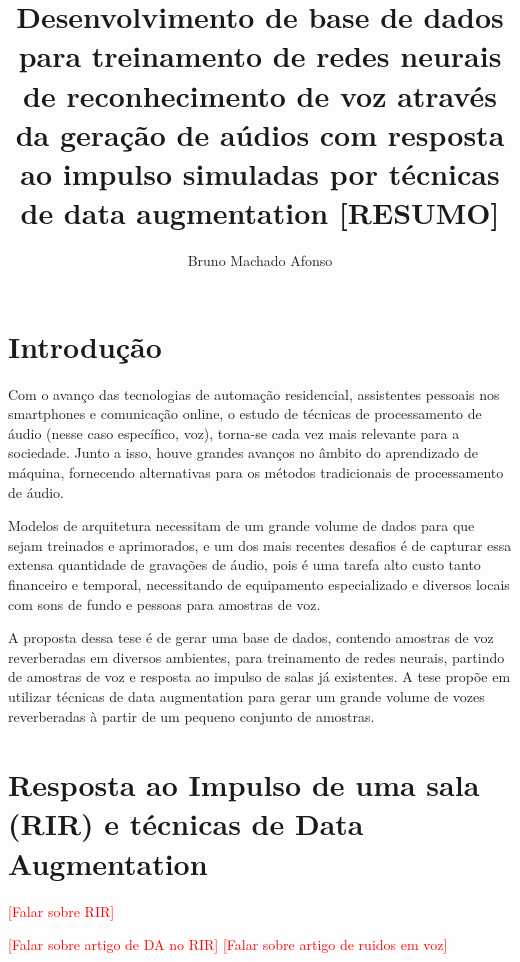 \documentclass{article}
\title{Desenvolvimento de base de dados para treinamento de redes neurais de reconhecimento de voz
através da geração de aúdios com resposta ao impulso simuladas por técnicas de data augmentation [RESUMO]}
\author{Bruno Machado Afonso}
\begin{document}
\maketitle

\section{Introdução}

Com o avanço das tecnologias de automação residencial, assistentes pessoais nos
smartphones e comunicação online, o estudo de técnicas de processamento de áudio (nesse 
caso específico, voz), torna-se cada vez mais relevante para a sociedade.
Junto a isso, houve grandes avanços no âmbito do aprendizado de máquina, fornecendo
alternativas para os métodos tradicionais de processamento de áudio.

Modelos de arquitetura necessitam de um grande volume de dados para que sejam 
treinados e aprimorados, e um dos mais recentes desafios é de capturar essa extensa 
quantidade de gravações de áudio, pois é uma tarefa alto custo tanto financeiro e 
temporal, necessitando de equipamento especializado e diversos locais com sons de fundo
e pessoas para amostras de voz.

A proposta dessa tese é de gerar uma base de dados, contendo amostras de voz reverberadas
em diversos ambientes, para treinamento de redes neurais, 
partindo de amostras de voz e resposta ao impulso de salas já existentes.
A tese propõe em utilizar técnicas de data augmentation para gerar um grande volume
de vozes reverberadas à partir de um pequeno conjunto de amostras.


\section{Resposta ao Impulso de uma sala (RIR) e técnicas de Data Augmentation}

\textcolor{red}{\LARGE{[Falar sobre RIR]}} \newline



\textcolor{red}{\LARGE{[Falar sobre artigo de DA no RIR]}} \newline
\textcolor{red}{\LARGE{[Falar sobre artigo de ruidos em voz]}} \newline


\cite{RIR_Data_Aug}
\cite{Speech_Rec}

 

\end{document}
